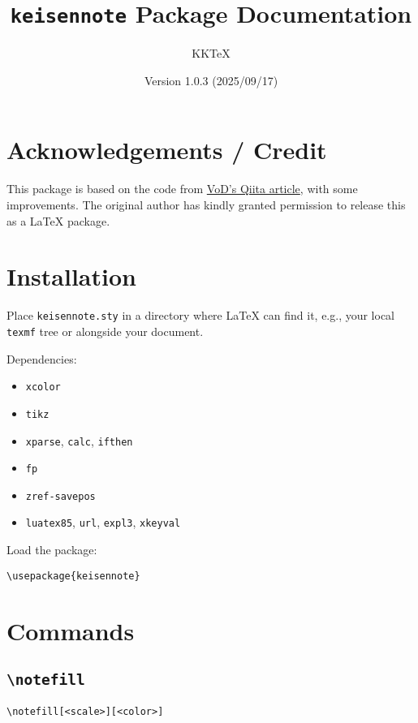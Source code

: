 \documentclass[a4paper,12pt]{article}
\title{\texttt{keisennote} Package Documentation}
\author{KKTeX}
\date{Version 1.0.3 (2025/09/17)}
\begin{document}
\begin{titlepage}
  \maketitle
\end{titlepage}
\newpage
\tableofcontents
\newpage

\section{Acknowledgements / Credit}

This package is based on the code from 
\href{https://qiita.com/VoD/items/6849e63b978050218d2f}{VoD's Qiita article}, 
with some improvements. The original author has kindly granted permission 
to release this as a LaTeX package.

\section{Installation}

Place \texttt{keisennote.sty} in a directory where LaTeX can find it, e.g., your local \texttt{texmf} tree or alongside your document.

Dependencies:
\begin{itemize}
    \item \texttt{xcolor} 
    \item \texttt{tikz}
    \item \texttt{xparse}, \texttt{calc}, \texttt{ifthen}
    \item \texttt{fp}
    \item \texttt{zref-savepos} 
    \item \texttt{luatex85}, \texttt{url}, \texttt{expl3}, \texttt{xkeyval}
\end{itemize}


Load the package:

\begin{verbatim}
\usepackage{keisennote}
\end{verbatim}

\section{Commands}

\subsection{\texttt{\textbackslash notefill}}
\begin{verbatim}
\notefill[<scale>][<color>]
\end{verbatim}
\end{document}
